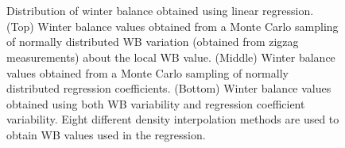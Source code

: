 \documentclass{sfuthesis}
\begin{document}
\begin{appendices}
\begin{figure}[H]
	\centering
	\\%
	\\%
	\caption[]{Distribution of winter balance obtained using linear regression. (Top) Winter balance values obtained from a Monte Carlo sampling of normally distributed WB variation (obtained from zigzag measurements) about the local WB value. (Middle) Winter balance  values obtained from a Monte Carlo sampling of normally distributed regression coefficients. (Bottom) Winter balance  values obtained using both WB variability and regression coefficient variability. Eight different density interpolation methods are used to obtain WB values used in the regression.}
	\label{fig:WSMB_LR_allDensity}
\end{figure}



\end{appendices}
\end{document}
